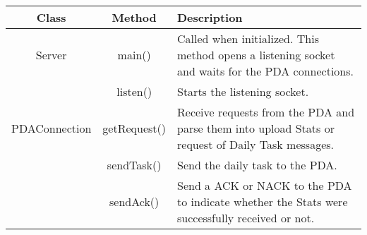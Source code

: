 \documentclass{article}
\begin{document}
\begin{tabular}[t]{|c|c|p{4in}|}
\hline
Class & Method & Description \\
\hline %

Server

	& main() & Called when initialized. This method opens a listening socket and waits for the PDA connections. \\

	\cline{2-3}

  & listen() & Starts the listening socket. \\

\hline %

PDAConnection
      & getRequest() & Receive requests from the PDA and parse them into upload Stats or request of Daily Task messages. \\
\cline{2-3}
      & sendTask() & Send the daily task to the PDA. \\
\cline{2-3}
      & sendAck() & Send a ACK or NACK to the PDA to indicate whether the Stats were successfully received or not. \\
\hline
\end{tabular}
\end{document}
